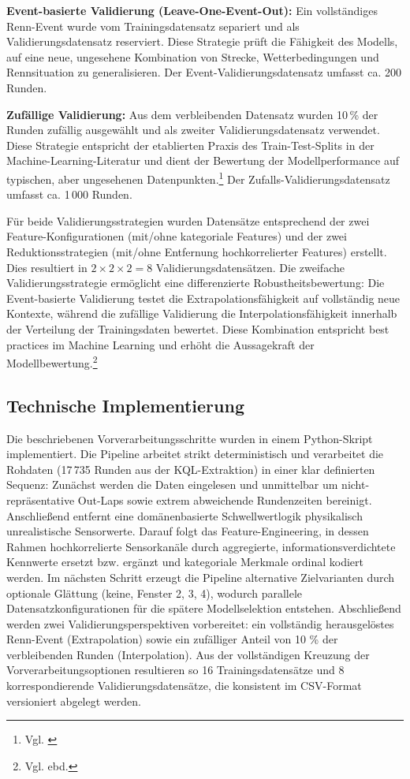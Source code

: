 \textbf{Event-basierte Validierung (Leave-One-Event-Out):}
Ein vollständiges Renn-Event wurde vom Trainingsdatensatz separiert und als Validierungsdatensatz reserviert. Diese Strategie prüft die Fähigkeit des Modells, auf eine neue, ungesehene Kombination von Strecke, Wetterbedingungen und Rennsituation zu generalisieren. Der Event-Validierungsdatensatz umfasst ca. 200 Runden.

\textbf{Zufällige Validierung:}
Aus dem verbleibenden Datensatz wurden 10\,\% der Runden zufällig ausgewählt und als zweiter Validierungsdatensatz verwendet. Diese Strategie entspricht der etablierten Praxis des Train-Test-Splits in der Machine-Learning-Literatur und dient der Bewertung der Modellperformance auf typischen, aber ungesehenen Datenpunkten.\footnote{Vgl. \cite{Baheti2021}} Der Zufalls-Validierungsdatensatz umfasst ca. 1\,000 Runden.

Für beide Validierungsstrategien wurden Datensätze entsprechend der zwei Feature-Konfigurationen (mit/ohne kategoriale Features) und der zwei Reduktionsstrategien (mit/ohne Entfernung hochkorrelierter Features) erstellt. Dies resultiert in $2 \times 2 \times 2 = 8$ Validierungsdatensätzen.
Die zweifache Validierungsstrategie ermöglicht eine differenzierte Robustheitsbewertung: Die Event-basierte Validierung testet die Extrapolationsfähigkeit auf vollständig neue Kontexte, während die zufällige Validierung die Interpolationsfähigkeit innerhalb der Verteilung der Trainingsdaten bewertet. Diese Kombination entspricht best practices im Machine Learning und erhöht die Aussagekraft der Modellbewertung.\footnote{Vgl. ebd.}


\subsection{Technische Implementierung}

Die beschriebenen Vorverarbeitungsschritte wurden in einem Python-Skript implementiert. Die Pipeline arbeitet strikt deterministisch und verarbeitet die Rohdaten (17\,735 Runden aus der KQL-Extraktion) in einer klar definierten Sequenz: Zunächst werden die Daten eingelesen und unmittelbar um nicht-repräsentative Out-Laps sowie extrem abweichende Rundenzeiten bereinigt. Anschließend entfernt eine domänenbasierte Schwellwertlogik physikalisch unrealistische Sensorwerte. Darauf folgt das Feature-Engineering, in dessen Rahmen hochkorrelierte Sensorkanäle durch aggregierte, informationsverdichtete Kennwerte ersetzt bzw. ergänzt und kategoriale Merkmale ordinal kodiert werden. Im nächsten Schritt erzeugt die Pipeline alternative Zielvarianten durch optionale Glättung (keine, Fenster 2, 3, 4), wodurch parallele Datensatzkonfigurationen für die spätere Modellselektion entstehen. Abschließend werden zwei Validierungsperspektiven vorbereitet: ein vollständig herausgelöstes Renn-Event (Extrapolation) sowie ein zufälliger Anteil von 10 \% der verbleibenden Runden (Interpolation). Aus der vollständigen Kreuzung der Vorverarbeitungsoptionen resultieren so 16 Trainingsdatensätze und 8 korrespondierende Validierungsdatensätze, die konsistent im CSV-Format versioniert abgelegt werden.

